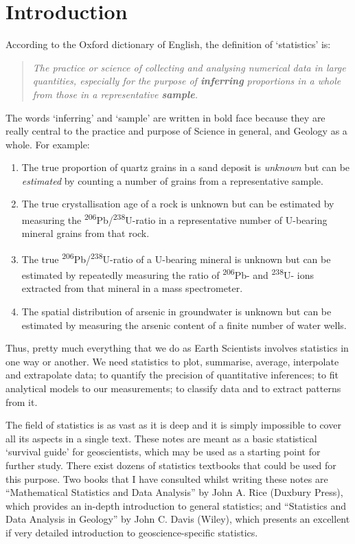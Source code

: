 \chapter{Introduction}
\label{ch:introduction}

According to the Oxford dictionary of English, the definition of
`statistics' is:

\begin{quote}
  \textit{The practice or science of collecting and analysing
    numerical data in large quantities, especially for the purpose of
    \textbf{inferring} proportions in a whole from those in a
    representative \textbf{sample}.}
\end{quote}

The words `inferring' and `sample' are written in bold face because
they are really central to the practice and purpose of Science in
general, and Geology as a whole. For example:

\begin{enumerate}
\item The true proportion of quartz grains in a sand deposit is
  \emph{unknown} but can be \emph{estimated} by counting a number of
  grains from a representative sample.
\item The true crystallisation age of a rock is unknown but can be
  estimated by measuring the
  \textsuperscript{206}Pb/\textsuperscript{238}U-ratio in a
  representative number of U-bearing mineral grains from that rock.
\item The true \textsuperscript{206}Pb/\textsuperscript{238}U-ratio of
  a U-bearing mineral is unknown but can be estimated by repeatedly
  measuring the ratio of \textsuperscript{206}Pb- and
  \textsuperscript{238}U- ions extracted from that mineral in a mass
  spectrometer.
\item The spatial distribution of arsenic in groundwater is unknown
  but can be estimated by measuring the arsenic content of a finite
  number of water wells.
\end{enumerate}

Thus, pretty much everything that we do as Earth Scientists involves
statistics in one way or another. We need statistics to plot,
summarise, average, interpolate and extrapolate data; to quantify the
precision of quantitative inferences; to fit analytical models to our
measurements; to classify data and to extract patterns from it.\medskip

The field of statistics is as vast as it is deep and it is simply
impossible to cover all its aspects in a single text. These notes are
meant as a basic statistical `survival guide' for geoscientists, which
may be used as a starting point for further study. There exist dozens
of statistics textbooks that could be used for this purpose. Two books
that I have consulted whilst writing these notes are ``Mathematical
Statistics and Data Analysis'' by John A. Rice (Duxbury Press), which
provides an in-depth introduction to general statistics; and
``Statistics and Data Analysis in Geology'' by John C. Davis (Wiley),
which presents an excellent if very detailed introduction to
geoscience-specific statistics.\medskip

